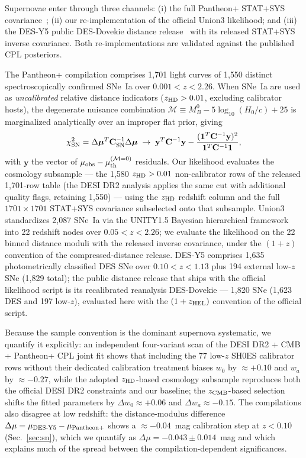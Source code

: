 \documentclass[aps,prd,preprint,superscriptaddress,nofootinbib]{revtex4-2}
\begin{document}
Supernovae enter through three channels: (i) the full Pantheon+ STAT+SYS covariance~\cite{Brout2022,Scolnic2022}; (ii) our re-implementation of the official Union3 likelihood; and (iii) the DES-Y5 public DES-Dovekie distance release~\cite{Popovic2025} with its released STAT+SYS inverse covariance. Both re-implementations are validated against the published CPL posteriors.

The Pantheon+ compilation comprises 1{,}701 light curves of 1{,}550 distinct spectroscopically confirmed SNe~Ia over $0.001 < z < 2.26$. When SNe~Ia are used as \emph{uncalibrated} relative distance indicators ($z_{\rm HD} > 0.01$, excluding calibrator hosts), the degenerate nuisance combination $\mathcal{M} \equiv M_B^0 - 5\log_{10}(H_0/c) + 25$ is marginalized analytically over an improper flat prior, giving
\begin{equation}
\chi^2_{\rm SN} = \Delta\boldsymbol{\mu}^T \mathbf{C}_{\rm SN}^{-1} \Delta\boldsymbol{\mu} \;\rightarrow\; \mathbf{y}^T \mathbf{C}^{-1} \mathbf{y} - \frac{(\mathbf{1}^T \mathbf{C}^{-1} \mathbf{y})^2}{\mathbf{1}^T \mathbf{C}^{-1} \mathbf{1}},
\label{eq:mmarg}
\end{equation}
with $\mathbf{y}$ the vector of $\mu_{\rm obs} - \mu_{\rm th}^{(\mathcal{M}=0)}$ residuals. Our likelihood evaluates the cosmology subsample --- the 1{,}580 $z_{\rm HD} > 0.01$ non-calibrator rows of the released 1{,}701-row table (the DESI DR2 analysis applies the same cut with additional quality flags, retaining 1{,}550) --- using the $z_{\rm HD}$ redshift column and the full $1701 \times 1701$ STAT+SYS covariance subselected onto that subsample. Union3 standardizes 2{,}087 SNe~Ia via the UNITY1.5 Bayesian hierarchical framework into 22 redshift nodes over $0.05 < z < 2.26$; we evaluate the likelihood on the 22 binned distance moduli with the released inverse covariance, under the $(1+z)$ convention of the compressed-distance release. DES-Y5 comprises 1{,}635 photometrically classified DES SNe over $0.10 < z < 1.13$ plus 194 external low-$z$ SNe (1{,}829 total); the public distance release that ships with the official likelihood script is its recalibrated reanalysis DES-Dovekie --- 1{,}820 SNe (1{,}623 DES and 197 low-$z$), evaluated here with the $(1+z_{\rm HEL})$ convention of the official script.

Because the sample convention is the dominant supernova systematic, we quantify it explicitly: an independent four-variant scan of the DESI DR2 + CMB + Pantheon+ CPL joint fit shows that including the 77 low-$z$ SH0ES calibrator rows without their dedicated calibration treatment biases $w_0$ by $\approx +0.10$ and $w_a$ by $\approx -0.27$, while the adopted $z_{\rm HD}$-based cosmology subsample reproduces both the official DESI DR2 constraints and our baseline; the $z_{\rm CMB}$-based selection shifts the fitted parameters by $\Delta w_0 \approx +0.06$ and $\Delta w_a \approx -0.15$. The compilations also disagree at low redshift: the distance-modulus difference $\Delta\mu = \mu_{\rm DES\text{-}Y5} - \mu_{\rm Pantheon+}$ shows a $\approx -0.04$~mag calibration step at $z < 0.10$ (Sec.~\ref{sec:sn}), which we quantify as $\Delta\mu = -0.043 \pm 0.014$~mag and which explains much of the spread between the compilation-dependent significances.
\end{document}
